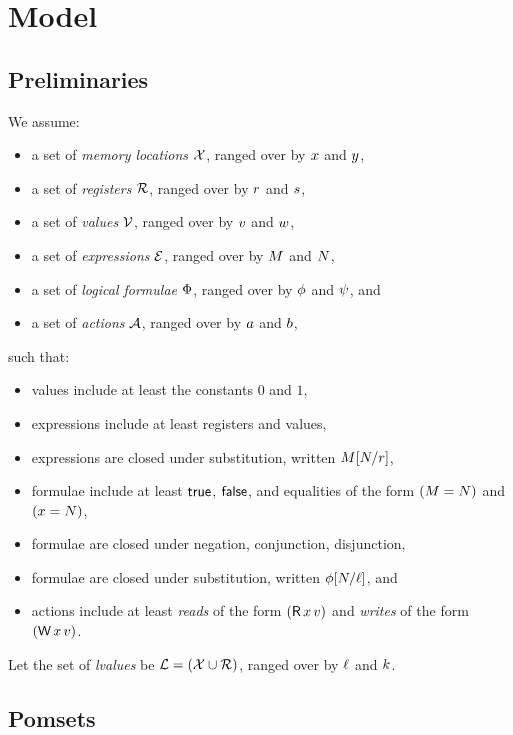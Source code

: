 \section{Model}

\subsection{Preliminaries}

We assume:
\begin{itemize}
\item a set of \emph{memory locations} $\mathcal{X}$, ranged over by
  $x$ and $y$,
\item a set of \emph{registers} $\mathcal{R}$, ranged over by
  $r$ and $s$,
\item a set of \emph{values} $\mathcal{V}$, ranged over by
  $v$ and $w$,
\item a set of \emph{expressions} $\mathcal{E}$, ranged over by
  $M$ and $N$,
\item a set of \emph{logical formulae} $\Phi$, ranged over by
  $\phi$ and $\psi$, and
\item a set of \emph{actions} $\mathcal{A}$, ranged over by $a$ and $b$,
\end{itemize}
such that:
\begin{itemize}
\item values include at least the constants $0$ and $1$,
\item expressions include at least registers and values,
\item expressions are closed under substitution, written $M[N/r]$,
\item formulae include at least $\mathsf{true}$, $\mathsf{false}$, and equalities of the form $(M=N)$ and $(x=N)$,
\item formulae are closed under negation, conjunction, disjunction,
\item formulae are closed under substitution, written $\phi[N/\ell]$, and
\item actions include at least \emph{reads} of the form $(\mathsf{R}\,x\,v)$
  and \emph{writes} of the form $(\mathsf{W}\,x\,v)$.
\end{itemize}
Let the set of \emph{lvalues} be $\mathcal{L}=(\mathcal{X}\cup\mathcal{R})$, ranged over by $\ell$ and $k$.

\subsection{Pomsets}

